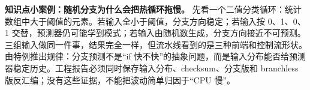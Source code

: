 \begin{casebox}
\textbf{知识点小案例：随机分支为什么会把热循环拖慢。}
先看一个二值分类循环：统计数组中大于阈值的元素。若输入全小于阈值，分支方向稳定；若输入按 0、1、0、1 交替，预测器仍可能学到模式；若输入由随机数生成，分支方向接近不可预测。三组输入做同一件事，结果完全一样，但流水线看到的是三种前端和控制流形状。由特例推出规律：分支预测不是“if 快不快”的抽象问题，而是输入分布能否给预测器稳定历史。工程报告必须同时保存输入分布、checksum、分支版和 branchless 版反汇编；没有这些证据，不能把波动简单归因于“CPU 慢”。
\end{casebox}
